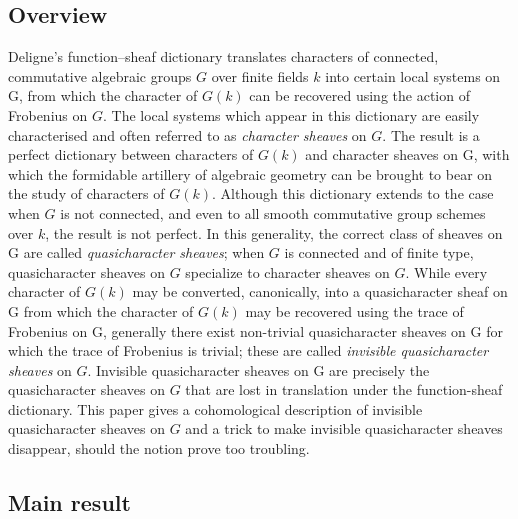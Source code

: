 \documentclass{amsart}
\theoremstyle{plain}
\theoremstyle{definition}
\theoremstyle{remark}
\newcommand{\Fq}{k}
\begin{document}
\subsection*{Overview}
Deligne's function--sheaf dictionary translates characters of connected, commutative algebraic groups $G$ over finite fields $\Fq$ into certain local systems on G, from which the character of $G(\Fq)$ can be recovered using the action of Frobenius on $G$.
The local systems which appear in this dictionary are easily characterised and often referred to as \emph{character sheaves} on $G$.
The result is a perfect dictionary between characters of $G(\Fq)$ and character sheaves on G, with which the formidable artillery of algebraic geometry can be brought to bear on the study of characters of $G(\Fq)$.
Although this dictionary extends to the case when $G$ is not connected, and even to all smooth commutative group schemes over $\Fq$, the result is not perfect.
In this generality, the correct class of sheaves on G are called \emph{quasicharacter sheaves}; when $G$ is connected and of finite type, quasicharacter sheaves on $G$ specialize to character sheaves on $G$.
While every character of $G(\Fq)$ may be converted, canonically, into a quasicharacter sheaf on G from which the character of $G(\Fq)$ may be recovered using the trace of Frobenius on G, generally there exist non-trivial quasicharacter sheaves on G for which the trace of Frobenius is trivial; these are called \emph{invisible quasicharacter sheaves} on $G$.
Invisible quasicharacter sheaves on G are precisely the quasicharacter sheaves on $G$ that are lost in translation under the function-sheaf dictionary.
This paper gives a cohomological description of invisible quasicharacter sheaves on $G$
and a trick to make invisible quasicharacter sheaves disappear,
should the notion prove too troubling.

\subsection*{Main result}
\end{document}
